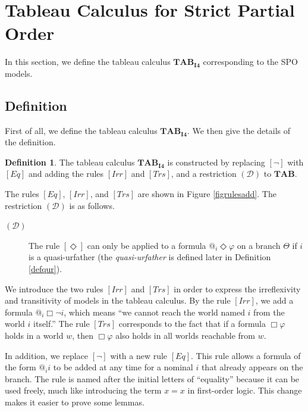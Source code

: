 \documentclass{article}
\theoremstyle{definition}
\newtheorem{definition}{Definition}[section]
\newcommand{\Dia}{\Diamond}
\newcommand{\tableau}{\mathbf{TAB}}
\newcommand{\Drest}{(\mathcal{D})}
\newcommand{\irr}{\mathit{Irr}}
\newcommand{\trans}{\mathit{Trs}}
\newcommand{\reflexivity}{\mathit{Eq}}
\newcommand{\tableauIF}{\mathbf{TAB}_{\mathbf{I4}}}
\begin{document}
\section{Tableau Calculus for Strict Partial Order}
\label{secSPO}

In this section, we define the tableau calculus $\tableauIF$ corresponding to the SPO models.

\subsection{Definition}

First of all, we define the tableau calculus $\tableauIF$. We then give the details of the definition.

\begin{definition}
    The tableau calculus $\tableauIF$ is constructed by replacing $[\neg]$ with $[\reflexivity]$ and adding the rules $[\irr]$ and $[\trans]$, and a restriction $\Drest$ to $\tableau$.
\end{definition}

The rules $[\reflexivity]$, $[\irr]$, and $[\trans]$ are shown in Figure \ref{figrulesadd}. The restriction $\Drest$ is as follows.

\begin{description}
  \item[$\Drest$] The rule $[\Dia]$ can only be applied to a formula $@_i \Dia \varphi$ on a branch $\Theta$ if $i$ is a quasi-urfather (the \emph{quasi-urfather} is defined later in Definition \ref{defqur}).
\end{description}

We introduce the two rules $[\irr]$ and $[\trans]$ in order to express the irreflexivity and transitivity of models in the tableau calculus. By the rule $[\irr]$, we add a formula $@_i \Box \neg i$, which means ``we cannot reach the world named $i$ from the world $i$ itself.'' The rule $[\trans]$ corresponds to the fact that if a formula $\Box \varphi$ holds in a world $w$, then $\Box \varphi$ also holds in all worlds reachable from $w$.

In addition, we replace $[\neg]$ with a new rule $[\reflexivity]$. This rule allows a formula of the form $@_i i$ to be added at any time for a nominal $i$ that already appears on the branch. The rule is named after the initial letters of ``equality'' because it can be used freely, much like introducing the term $x = x$ in first-order logic. This change makes it easier to prove some lemmas.
\end{document}
